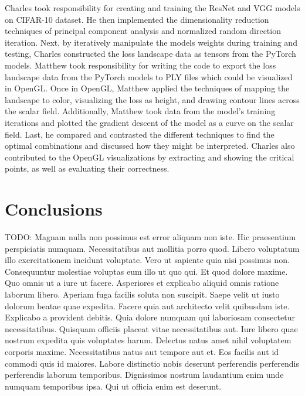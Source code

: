\documentclass{acmsiggraph}
\begin{document}
Charles took responsibility for creating and training the ResNet and VGG models on CIFAR-10 dataset.
He then implemented the dimensionality reduction techniques of principal component analysis and normalized random direction iteration.
Next, by iteratively manipulate the models weights during training and testing, Charles constructed the loss landscape data as tensors from the PyTorch models.
Matthew took responsibility for writing the code to export the loss landscape data from the PyTorch models to PLY files which could be visualized in OpenGL.
Once in OpenGL, Matthew applied the techniques of mapping the landscape to color, visualizing the loss as height, and drawing contour lines across the scalar field.
Additionally, Matthew took data from the model's training iterations and plotted the gradient descent of the model as a curve on the scalar field.
Last, he compared and contrasted the different techniques to find the optimal combinations and discussed how they might be interpreted.
Charles also contributed to the OpenGL visualizations by extracting and showing the critical points, as well as evaluating their correctness.



\section{Conclusions}
\label{sec:intro}

TODO:
Magnam nulla non possimus est error aliquam non iste. Hic praesentium perspiciatis numquam. Necessitatibus aut mollitia porro quod. Libero voluptatum illo exercitationem incidunt voluptate. Vero ut sapiente quia nisi possimus non. Consequuntur molestiae voluptas eum illo ut quo qui.
Et quod dolore maxime. Quo omnis ut a iure ut facere. Asperiores et explicabo aliquid omnis ratione laborum libero. Aperiam fuga facilis soluta non suscipit.
Saepe velit ut iusto dolorum beatae quae expedita. Facere quia aut architecto velit quibusdam iste. Explicabo a provident debitis. Quia dolore numquam qui laboriosam consectetur necessitatibus.
Quisquam officiis placeat vitae necessitatibus aut. Iure libero quae nostrum expedita quis voluptates harum. Delectus natus amet nihil voluptatem corporis maxime. Necessitatibus natus aut tempore aut et.
Eos facilis aut id commodi quis id maiores. Labore distinctio nobis deserunt perferendis perferendis perferendis laborum temporibus. Dignissimos nostrum laudantium enim unde numquam temporibus ipsa. Qui ut officia enim est deserunt.
\end{document}
